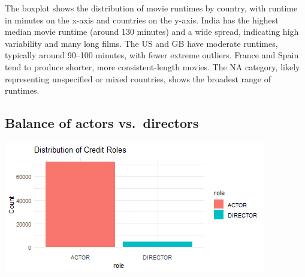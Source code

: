 \documentclass[11pt,preprint]{elsarticle}
\let\origfigure\figure
\let\endorigfigure\endfigure
\renewenvironment{figure}[1][2] {
    \expandafter\origfigure\expandafter[H]
} {
    \endorigfigure
}
\numberwithin{equation}{section}
\numberwithin{figure}{section}
\numberwithin{table}{section}
\begin{document}
The boxplot shows the distribution of movie runtimes by country, with
runtime in minutes on the x-axis and countries on the y-axis. India has
the highest median movie runtime (around 130 minutes) and a wide spread,
indicating high variability and many long films. The US and GB have
moderate runtimes, typically around 90--100 minutes, with fewer extreme
outliers. France and Spain tend to produce shorter, more
consistent-length movies. The NA category, likely representing
unspecified or mixed countries, shows the broadest range of runtimes.

\newpage

\subsection{Balance of actors
vs.~directors}\label{balance-of-actors-vs.-directors}

\begin{Shaded}
\begin{Highlighting}[]
\SpecialCharTok{\%\textgreater{}\%}
  \SpecialCharTok{\%\textgreater{}\%}
  \NormalTok{(}\NormalTok{(}\SpecialCharTok{+}
  \NormalTok{() }\SpecialCharTok{+}
  \NormalTok{(} \NormalTok{, } \NormalTok{) }\SpecialCharTok{+}
  \NormalTok{()}
\end{Highlighting}
\end{Shaded}

\begin{figure}

{\centering \includegraphics{23084103_Netflix_files/figure-latex/Figure 3a-1} 

}

\caption{Caption Here \label{Figure1}}\label{fig:Figure 3a}
\end{figure}
\end{document}
